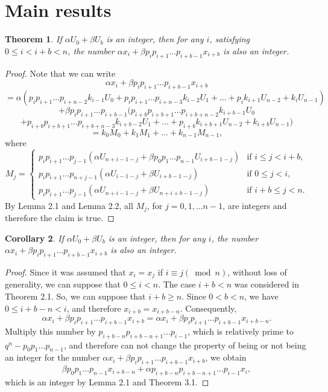 \documentclass[12pt, twoside, leqno]{article}
\newtheorem{theorem}{Theorem}[section]
\newtheorem{corollary}[theorem]{Corollary}
\theoremstyle{definition}
\numberwithin{equation}{section}
\begin{document}
\section{Main results}
\begin{theorem}{If $\alpha U_0+\beta U_b$ is an integer, then for any $i$, satisfying $0\le i<i+b< n$, the number $\alpha x_i+\beta p_i p_{i+1}\ldots p_{i+b-1} x_{i+b}$ is also an integer.}
\end{theorem}
\begin{proof} Note that we can write
$$
\alpha x_i+\beta p_i p_{i+1}\ldots p_{i+b-1} x_{i+b}
$$
$$
=\alpha (p_ip_{i+1}\ldots p_{i+n-2}k_{i-1}U_0+p_ip_{i+1}\ldots p_{i+n-3}k_{i-2}U_1+\ldots +p_ik_{i+1}U_{n-2}+k_iU_{n-1})
$$
$$
+\beta p_i p_{i+1}\ldots p_{i+b-1}(p_{i+b}p_{i+b+1}\ldots p_{i+b+n-2}k_{i+b-1}U_0
$$
$$
+p_{i+b}p_{i+b+1}\ldots p_{i+b+n-3}k_{i+b-2}U_1+\ldots +p_{i+b}k_{i+b+1} U_{n-2}+k_{i+b}U_{n-1})
$$ 
$$
=k_0M_0+k_1M_1+\ldots +k_{n-1}M_{n-1},
$$ 
where
$$
M_j=
    \begin{cases}
        p_i p_{i+1}\ldots p_{j-1} (\alpha U_{n+i-1-j}+\beta p_0 p_1\ldots p_{n-1} U_{i+b-1-j}) & \text{if } i\le j<i+b,\\
        p_i p_{i+1}\ldots p_{n+j-1} (\alpha U_{i-1-j}+\beta U_{i+b-1-j}) & \text{if } 0\le j<i,\\
        p_i p_{i+1}\ldots p_{j-1} (\alpha U_{n+i-1-j}+\beta U_{n+i+b-1-j}) & \text{if } i+b\le j<n.
    \end{cases}
$$
By Lemma 2.1 and Lemma 2.2, all $M_j$, for $j=0,1,\ldots n-1$, are integers and therefore the claim is true.
\end{proof}
\begin{corollary}{If $\alpha U_0+\beta U_b$ is an integer, then for any $i$, the number $\alpha x_i+\beta p_i p_{i+1}\ldots p_{i+b-1} x_{i+b}$ is also an integer.}
\end{corollary}
\begin{proof} 
Since it was assumed that $x_i=x_j$ if $i\equiv j (\bmod n)$, without loss of generality, we can suppose that $0\le i <n$. The case $i+b< n$ was considered in Theorem 2.1. So, we can suppose that $i+b\ge n$. Since $0<b<n$, we have $0\le i+b-n<i$, and therefore $x_{i+b}=x_{i+b-n}$. Consequently,
$$
\alpha x_i+\beta p_i p_{i+1}\ldots p_{i+b-1} x_{i+b}=\alpha x_i+\beta p_i p_{i+1}\ldots p_{i+b-1} x_{i+b-n}.
$$
Multiply this number by $p_{i+b-n}p_{i+b-n+1}\ldots p_{i-1}$, which is relatively prime to  $q^{n}-p_0 p_1\ldots p_{n-1}$, and therefore can not change the property of being or not being an integer for the number $\alpha x_i+\beta p_i p_{i+1}\ldots p_{i+b-1} x_{i+b}$, we obtain
$$
\beta p_0 p_{1}\ldots p_{n-1} x_{i+b-n}+\alpha p_{i+b-n} p_{i+b-n+1}\ldots p_{i-1} x_{i},
$$
which is an integer by Lemma 2.1 and Theorem 3.1.
\end{proof}
\end{document}
